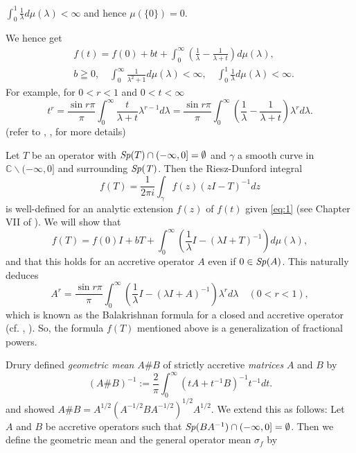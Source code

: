 \documentclass[reqno]{amsart}
\theoremstyle{definition}
\theoremstyle{remark}
\begin{document}
\begin{center}
$\int_0^1 \frac{1}{\lambda} d\mu(\lambda)<\infty$ and hence $\mu(\{0\})=0$.
\end{center}
 We hence get 
\begin{equation}
\begin{split}
&f(t)= f(0) + bt + \int_0^{\infty} (\frac{1}{\lambda} - \frac{1}{\lambda +t}) d\mu(\lambda), \\ 
&b\geqq 0, \quad \int_0^{\infty}\frac{1}{\lambda^2 + 1} d\mu (\lambda) <\infty, \quad \int_0^1 
\frac{1}{\lambda} d\mu(\lambda)<\infty. \label{eq:1}
\end{split}
\end{equation}
For example,  for $0<r<1$ and $0<t<\infty$
$$t^r = \frac{\sin r \pi}{\pi} \int_0^{\infty} \frac{t}{\lambda + t } \lambda ^{r-1} d\lambda =
 \frac{\sin r \pi}{\pi} \int_0^{\infty} 
 (\frac{1}{\lambda} - \frac{1}{\lambda +t}) \lambda ^{r} d\lambda.$$
(refer to \cite{D}, \cite{B-M}, \cite{Simon} for more details)\par
Let $T$ be an operator with ${\it Sp}(T) \cap (-\infty, 0] = \emptyset$ and 
 $\gamma$ a smooth curve 
in $\mathbb{C} \smallsetminus (-\infty, 0]$ and surrounding 
$\it{Sp}(T)$. Then 
the Riesz-Dunford integral
$$f(T) = \frac{1}{2\pi i}\int_{\gamma}  f(z) (z I - T)^{-1} dz$$
 is well-defined for an analytic extension $f(z)$ of $f(t)$ given \eqref{eq:1}
(see Chapter VII of \cite{D-S}).
We will show that
$$ f(T)=  f(0) I  + b T + \int_0^{\infty} \left(\frac{1}{\lambda } I - (\lambda I  + T)^{-1}\right)d\mu(\lambda), $$
and that this holds for an accretive operator $A$ even if $0\in {\it Sp}(A)$.
This naturally deduces 
$$A^r = \frac{\sin r \pi}{\pi} \int_0^{\infty} 
 (\frac{1}{\lambda} I - (\lambda I + A)^{-1}) \lambda ^{r} d\lambda \quad (0<r<1),$$
which is known as the Balakrishnan formula\cite{Bal} for a closed and accretive operator
 (cf. \cite{N-F}, \cite{Kato-book}).
  So, the formula $f(T)$ mentioned above is a generalization of fractional powers. \par
 Drury \cite{Drury}
defined {\it geometric mean} $A\# B$ of strictly accretive {\it matrices} $A$ and $B$ by 
\begin{equation}\label{eq:1-0}
(A\# B)^{-1}:= \frac{2}{\pi} \int_0^{\infty} (tA + t^{-1} B)^{-1} t^{-1} d t.
\end{equation}
and showed $A \# B = A^{1/2} (A^{-1/2} B A^{-1/2})^{1/2} A^{1/2}$. We extend this as follows: 
Let $A$ and $B$ be accretive operators such that  
${\it Sp}(BA^{-1}) \cap (-\infty, 0] = \emptyset$.  
Then we define the geometric mean and the general operator mean $\sigma_f$ by 
\end{document}
